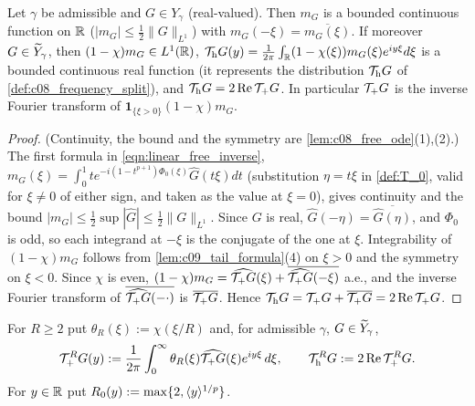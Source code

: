 \begin{lemma}[Reality; $\mc T_{\textup{h}}=2\operatorname{Re}\mc T_+$]
  \label{lem:c09_conjugate_symmetry}
  Let $\gamma$ be admissible and $G\in Y_\gamma$ (real-valued). Then $m_G$ is a bounded continuous function on $\mathbb{R}$
  ($|m_G|\le\frac12\|G\|_{L^1}$) with $m_G(-\xi)=\overline{m_G(\xi)}$. If moreover $G\in\widetilde{Y}_\gamma$, then
  $(1-\chi)m_G\in L^1(\mathbb{R})$, $\mathcal{T}_{\textup{h}}G(y)=\frac1{2\pi}\int_{\mathbb{R}}(1-\chi(\xi))m_G(\xi)e^{iy\xi}d\xi$ is a bounded continuous real
  function (it represents the distribution $\mathcal{T}_{\textup{h}}G$ of \cref{def:c08_frequency_split}), and $\mathcal{T}_{\textup{h}}G=2\operatorname{Re}\mathcal{T}_+G$.
  In particular $\mathcal{T}_+G$ is the inverse Fourier transform of $\mathbf 1_{\{\xi>0\}}(1-\chi)m_G$.
\end{lemma}
\begin{proof}
  (Continuity, the bound and the symmetry are \cref{lem:c08_free_ode}(1),(2).) The first formula in \eqref{eqn:linear_free_inverse}, $m_G(\xi)=\int_0^1te^{-i(1-t^{p+1})\Phi_0(\xi)}\widehat G(t\xi)dt$ (substitution
  $\eta=t\xi$ in \cref{def:T_0}, valid for $\xi\neq0$ of either sign, and taken as the value at $\xi=0$), gives continuity and the bound
  $|m_G|\le\frac12\sup|\widehat G|\le\frac12\|G\|_{L^1}$. Since $G$ is real, $\widehat G(-\eta)=\overline{\widehat G(\eta)}$, and $\Phi_0$ is odd, so
  each integrand at $-\xi$ is the conjugate of the one at $\xi$. Integrability of $(1-\chi)m_G$ follows from
  \cref{lem:c09_tail_formula}(4) on $\xi>0$ and the symmetry on $\xi<0$. Since $\chi$ is even,
  $(1-\chi)m_G=\widehat{\mathcal{T}_+G}(\xi)+\overline{\widehat{\mathcal{T}_+G}(-\xi)}$ a.e., and the inverse Fourier transform of
  $\overline{\widehat{\mathcal{T}_+G}(-\cdot)}$ is $\overline{\mathcal{T}_+G}$. Hence $\mathcal{T}_{\textup{h}}G=\mathcal{T}_+G+\overline{\mathcal{T}_+G}=2\operatorname{Re}\mathcal{T}_+G$.
\end{proof}

\begin{definition}
  \label{def:c09_truncation}
  For $R\ge2$ put $\theta_R(\xi):=\chi(\xi/R)$ and, for admissible $\gamma$, $G\in\widetilde{Y}_\gamma$,
  \[
    \mathcal{T}_+^RG(y):=\frac1{2\pi}\int_0^\infty\theta_R(\xi)\widehat{\mathcal{T}_+G}(\xi)e^{iy\xi}\,d\xi,\qquad
    \mathcal{T}_{\textup{h}}^RG:=2\operatorname{Re}\mathcal{T}_+^RG .
  \]
  For $y\in\mathbb{R}$ put $R_0(y):=\max\{2,\langle y \rangle^{1/p}\}$.
\end{definition}

